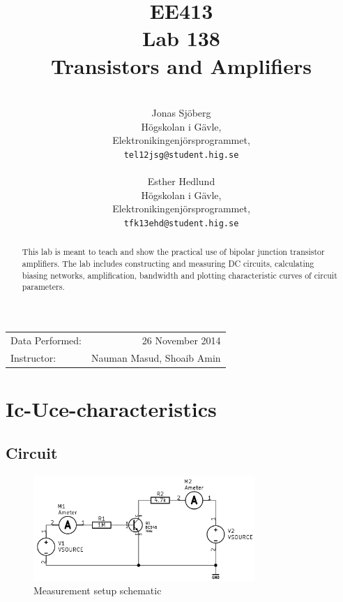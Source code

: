 \documentclass[11pt,a4paper]{article}
\title{EE413 \\ Lab 138 \\ Transistors and Amplifiers}
\author{\\
  Jonas Sjöberg\\
  Högskolan i Gävle,\\
  Elektronikingenjörsprogrammet,\\
  \texttt{tel12jsg@student.hig.se}\\
  \\
  Esther Hedlund\\
  Högskolan i Gävle,\\
  Elektronikingenjörsprogrammet,\\
  \texttt{tfk13ehd@student.hig.se}\\}
\date{}
\begin{document}
\maketitle

\begin{center}
\begin{tabular}{l r}
    Data Performed: & 26 November 2014 \\
    Instructor: & Nauman Masud, Shoaib Amin
\end{tabular}
\end{center}

\begin{abstract}
This lab is meant to teach and show the practical use of bipolar junction transistor amplifiers. The lab includes constructing and measuring DC circuits, calculating biasing networks, amplification, bandwidth and plotting characteristic curves of circuit parameters.
\end{abstract}

\newpage

{
\hypersetup{linkcolor=black}
\setcounter{tocdepth}{3}
\tableofcontents
}

\newpage


\section{Ic-Uce-characteristics}\label{ic-uce-characteristics}

\subsection{Circuit}\label{circuit}

\begin{figure}[htbp]
    \centering
    \includegraphics[width=0.75\textwidth]{img/ic-uce_schem}
    \caption{Measurement setup schematic}
    \label{fig:ic-uce_schem}
\end{figure}
\end{document}
